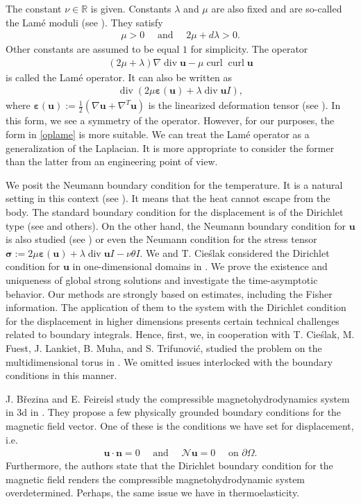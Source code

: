 \documentclass[11pt]{article}
\numberwithin{equation}{section}
\theoremstyle{plain}
\newcommand\bb[1]{\mathbf{#1}}
\renewcommand{\r}{\mathbb{R}}
\newcommand{\ul}{\frac{1}{2}}
\newcommand{\ant}{\quad\textrm{ and }\quad}
\renewcommand{\div}{\operatorname{div}}
\DeclareMathOperator{\curl}{curl}
\let \epsilon\varepsilon
\newcommand{\wspnd}{2\mu+\lambda}
\newcommand{\bu}{\bb{u}}
\newcommand{\bs}[1]{\boldsymbol{#1}}
\newcommand{\N}{\mathcal{N}}
\begin{document}
The constant $\nu\in\r$ is given. Constants $\lambda$ and $\mu$ are also fixed and are so-called the Lam\'e moduli (see \cite{Rackebook, Slaughter}). They satisfy
\begin{align*}
\mu>0\ant 2\mu+d\lambda>0.
\end{align*}
Other constants are assumed to be equal $1$ for simplicity. The operator
\begin{align}\label{oplame}
(\wspnd)\nabla\div\bu-\mu\curl\curl\bu
\end{align}
is called the Lam\'e operator. It can also be written as
\begin{align*}
\div\left(2\mu\bs\epsilon(\bu)+\lambda\div\bu I\right),
\end{align*}
where $\bs\epsilon(\bu):=\ul\left(\nabla\bu+\nabla^T\bu\right)$ is the linearized deformation tensor (see \cite{Temamcont, Slaughter}). In this form, we see a symmetry of the operator. However, for our purposes, the form in \eqref{oplame} is more suitable. We can treat the Lam\'e operator as a generalization of the Laplacian. It is more appropriate to consider the former than the latter from an engineering point of view.

We posit the Neumann boundary condition for the temperature. It is a natural setting in this context (see \cite{CMT, Rackebook}). It means that the heat cannot escape from the body. The standard boundary condition for the displacement is of the Dirichlet type (see \cite{Rackebook, Winkler1, Winkler2, Hrusa2, TC2, CMT, Racke1, Racke2} and others). On the other hand, the Neumann boundary condition for $\bu$ is also studied (see \cite{Rackebook, Racke1, Slem}) or even the Neumann condition for the stress tensor $\bs\sigma:=2\mu\bs\epsilon(\bu)+\lambda\div\bu I-\nu\theta I$. We and T. Cie\'slak considered the Dirichlet condition for $\bu$ in one-dimensional domains in \cite{BC, BC2}. We prove the existence and uniqueness of global strong solutions and investigate the time-asymptotic behavior. Our methods are strongly based on estimates, including the Fisher information. The application of them to the system with the Dirichlet condition for the displacement in higher dimensions presents certain technical challenges related to boundary integrals. Hence, first, we, in cooperation with T. Cie\'slak, M. Fuest, J. Lankiet, B. Muha, and S. Trifunovi\'c, studied the problem on the multidimensional torus in \cite{Biest}. We omitted issues interlocked with the boundary conditions in this manner.

J. B\v{r}ezina and E. Feireisl study the compressible magnetohydrodynamics system in 3d in \cite{fei}. They propose a few physically grounded boundary conditions for the magnetic field vector. One of these is the conditions we have set for displacement, i.e.
\begin{align}\label{ubound}
\bu\cdot\bb n=0\ant\N\bu=0 \quad\textrm{ on }\partial\Omega.
\end{align}
Furthermore, the authors state that the Dirichlet boundary condition for the magnetic field renders the compressible magnetohydrodynamic system overdetermined. Perhaps, the same issue we have in thermoelasticity.
 
\end{document}
